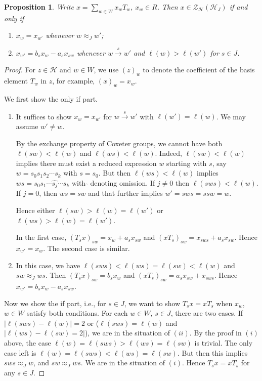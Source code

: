 \documentclass[a4paper, reqno, 14pt]{amsart}
\def\ch{\mathcal{H}}
\newtheorem{prop}[thm]{Proposition}
\theoremstyle{definition}
\theoremstyle{remark}
\numberwithin{equation}{section}
\numberwithin{thm}{section}
\begin{document}
        \begin{prop}\label{prop: diamond}
            Write $x=\sum_{w\in W}x_wT_w$, $x_w\in R$. Then $x\in \mathcal{Z}_{\ch}(\ch_{J})$ if and only if
            \begin{enumerate}
                \item $x_w=x_{w'}$ whenever $w\approx_J w'$;
                \item $x_{w'}=b_sx_w-a_sx_{sw}$ whenever $w\xrightarrow{s} w'$ and $\ell(w)>\ell(w')$ for $s\in J$.
            \end{enumerate}
        \end{prop}

        \begin{proof}
            For $z\in \ch$ and $w\in W$, we use $(z)_w$ to denote the coefficient of the basis element $T_w$ in $z$, for example, $(x)_w=x_w$.

            We first show the only if part.
            \begin{enumerate}
                \item It suffices to show $x_w=x_{w'}$ for $w\xrightarrow{s} w'$ with $\ell(w')=\ell(w)$. We may assume $w'\neq w$.
                
                By the exchange property of Coxeter groups, we cannot have both $\ell(sw)<\ell(w)$ and $\ell(ws)<\ell(w)$. Indeed, $\ell(sw)<\ell(w)$ implies there must exist a reduced expression $w$ starting with $s$, say $w=s_0s_1s_2\cdots s_k$ with $s=s_0$. But then $\ell(ws)<\ell(w)$ implies $ws=s_0s_1\cdots \hat{s_j}\cdots s_k$ with $\hat{}$ denoting omission. If $j\neq 0$ then $\ell(sws)<\ell(w)$. If $j=0$, then $ws=sw$ and that further implies $w'=sws=ssw=w$.
                
                Hence either $\ell(sw)>\ell(w)=\ell(w')$ or $\ell(ws)>\ell(w)=\ell(w')$.

                In the first case, $(T_sx)_{sw}=x_w+a_sx_{sw}$ and $(xT_s)_{sw}=x_{sws}+a_sx_{sw}$. Hence $x_{w'}=x_w$. The second case is similar.

                \item In this case, we have $\ell(sws)<\ell(ws)=\ell(sw)<\ell(w)$ and $sw\approx_J ws$. Then $(T_sx)_{sw}=b_sx_w$ and $(xT_s)_{sw}=a_sx_{sw}+x_{sws}$. Hence $x_{w'}=b_sx_w-a_sx_{sw}$. 
            \end{enumerate}

            Now we show the if part, i.e., for $s\in J$, we want to show $T_sx=xT_s$ when $x_w$, $w\in W$ satisfy both conditions. For each $w\in W$, $s\in J$, there are two cases. If $|\ell(sws)-\ell(w)|=2$ or ($\ell(sws)=\ell(w)$ and $|\ell(ws)-\ell(sw)=2|$), we are in the situation of $(ii)$. By the proof in $(i)$ above, the case $\ell(w)=\ell(sws)>\ell(ws)=\ell(sw)$ is trivial. The only case left is $\ell(w)=\ell(sws)<\ell(ws)=\ell(sw)$. But then this implies $sws\approx_J w$, and $sw\approx_J ws$. We are in the situation of $(i)$. Hence $T_sx=xT_s$ for any $s\in J$.
        \end{proof}
\end{document}
